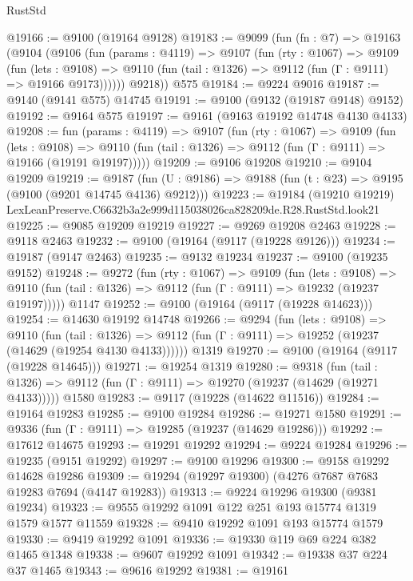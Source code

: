 \begin{lexlean}{RustStd}
\begin{coremodule}
@19166 := @9100 (@19164 @9128)
@19183 := @9099
    (fun (fn : @7) =>
    @19163
      (@9104
        (@9106
          (fun (params : @4119) =>
          @9107
            (fun (rty : @1067) =>
            @9109
              (fun (lets : @9108) =>
              @9110 (fun (tail : @1326) => @9112 (fun (Γ : @9111) => @19166 @9173))))))
        @9218))
    @575
@19184 := @9224 @9016
@19187 := @9140 (@9141 @575) @14745
@19191 := @9100 (@9132 (@19187 @9148) @9152)
@19192 := @9164 @575
@19197 := @9161 (@9163 @19192 @14748 @4130 @4133)
@19208 := fun (params : @4119) =>
  @9107
    (fun (rty : @1067) =>
    @9109
      (fun (lets : @9108) =>
      @9110 (fun (tail : @1326) => @9112 (fun (Γ : @9111) => @19166 (@19191 @19197)))))
@19209 := @9106 @19208
@19210 := @9104 @19209
@19219 := @9187
    (fun (U : @9186) => @9188 (fun (t : @23) => @9195 (@9100 (@9201 @14745 @4136) @9212)))
@19223 := @19184
    (@19210 @19219)
    LexLeanPreserve.C6632b3a2e999d115038026ca828209de.R28.RustStd.look21
@19225 := @9085 @19209 @19219
@19227 := @9269 @19208 @2463
@19228 := @9118 @2463
@19232 := @9100 (@19164 (@9117 (@19228 @9126)))
@19234 := @19187 (@9147 @2463)
@19235 := @9132 @19234
@19237 := @9100 (@19235 @9152)
@19248 := @9272
    (fun (rty : @1067) =>
    @9109
      (fun (lets : @9108) =>
      @9110 (fun (tail : @1326) => @9112 (fun (Γ : @9111) => @19232 (@19237 @19197)))))
    @1147
@19252 := @9100 (@19164 (@9117 (@19228 @14623)))
@19254 := @14630 @19192 @14748
@19266 := @9294
    (fun (lets : @9108) =>
    @9110
      (fun (tail : @1326) =>
      @9112 (fun (Γ : @9111) => @19252 (@19237 (@14629 (@19254 @4130 @4133))))))
    @1319
@19270 := @9100 (@19164 (@9117 (@19228 @14645)))
@19271 := @19254 @1319
@19280 := @9318
    (fun (tail : @1326) => @9112 (fun (Γ : @9111) => @19270 (@19237 (@14629 (@19271 @4133)))))
    @1580
@19283 := @9117 (@19228 (@14622 @11516))
@19284 := @19164 @19283
@19285 := @9100 @19284
@19286 := @19271 @1580
@19291 := @9336 (fun (Γ : @9111) => @19285 (@19237 (@14629 @19286)))
@19292 := @17612 @14675
@19293 := @19291 @19292
@19294 := @9224 @19284
@19296 := @19235 (@9151 @19292)
@19297 := @9100 @19296
@19300 := @9158 @19292 @14628 @19286
@19309 := @19294 (@19297 @19300) (@4276 @7687 @7683 @19283 @7694 (@4147 @19283))
@19313 := @9224 @19296 @19300 (@9381 @19234)
@19323 := @9555 @19292 @1091 @122 @251 @193 @15774 @1319 @1579 @1577 @11559
@19328 := @9410 @19292 @1091 @193 @15774 @1579
@19330 := @9419 @19292 @1091
@19336 := @19330 @119 @69 @224 @382 @1465 @1348
@19338 := @9607 @19292 @1091
@19342 := @19338 @37 @224 @37 @1465
@19343 := @9616 @19292
@19381 := @19161

\end{coremodule}
\end{lexlean}
